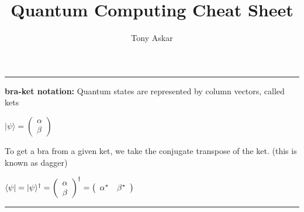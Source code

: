 \documentclass{article}
\title{\vspace{-4cm}
Quantum Computing Cheat Sheet
}
\author{ \vspace{-2cm}
Tony Askar
}
\date{} %
\begin{document}
\graphicspath{ {./images/} }

\maketitle
\hrule
\vspace{5pt}

\textbf{bra-ket notation:} Quantum states are represented by column vectors, called kets
\begin{center}
$ |{\psi} \rangle = \left( 
				\begin{array}{c}
					 {\alpha}\\
					 {\beta}
				\end{array} 
			\right)$
\end{center}

\noindent To get a bra from a given ket, we take the conjugate transpose of the ket. (this is known as dagger)
\begin{center}
$\langle{\psi}| = |{\psi} \rangle^\dagger = 
			 \left(
				 \begin{array}{c} 
				 	{\alpha}\\
					{\beta}
				\end{array} 
			\right)^\dagger = \left( \begin{array}{c c} {\alpha}^* &  {\beta}^* \end{array} \right)$\\
\end{center}

\hrule 
\vspace{5pt}
\end{document}
